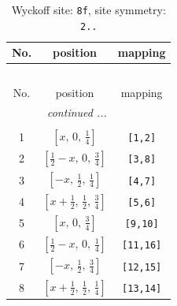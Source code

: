 \documentclass[fleqn,8pt]{jsarticle}
\begin{document}
\begin{longtable}{ccc}
\caption{Wyckoff site: {\tt 8f}, site symmetry: {\tt 2..}}
 \\
 \hline \hline
No. & position & mapping \\ \hline \endfirsthead

\multicolumn{2}{l}{\tablename\ \thetable{}} \\
 \hline \hline
No. & position & mapping \\ \hline \endhead

 \hline \hline
\multicolumn{2}{r}{\footnotesize\it continued ...} \\ \endfoot

 \hline \hline
\multicolumn{2}{r}{} \\ \endlastfoot

1 & $\left[ x,\, 0,\, \frac{1}{4} \right]$ & {\tt [1,2]} \\ \hline
2 & $\left[ \frac{1}{2} - x,\, 0,\, \frac{3}{4} \right]$ & {\tt [3,8]} \\ \hline
3 & $\left[ - x,\, \frac{1}{2},\, \frac{1}{4} \right]$ & {\tt [4,7]} \\ \hline
4 & $\left[ x + \frac{1}{2},\, \frac{1}{2},\, \frac{3}{4} \right]$ & {\tt [5,6]} \\ \hline
5 & $\left[ x,\, 0,\, \frac{3}{4} \right]$ & {\tt [9,10]} \\ \hline
6 & $\left[ \frac{1}{2} - x,\, 0,\, \frac{1}{4} \right]$ & {\tt [11,16]} \\ \hline
7 & $\left[ - x,\, \frac{1}{2},\, \frac{3}{4} \right]$ & {\tt [12,15]} \\ \hline
8 & $\left[ x + \frac{1}{2},\, \frac{1}{2},\, \frac{1}{4} \right]$ & {\tt [13,14]} \\
\end{longtable}
\renewcommand{\arraystretch}{1.2}
\end{document}
